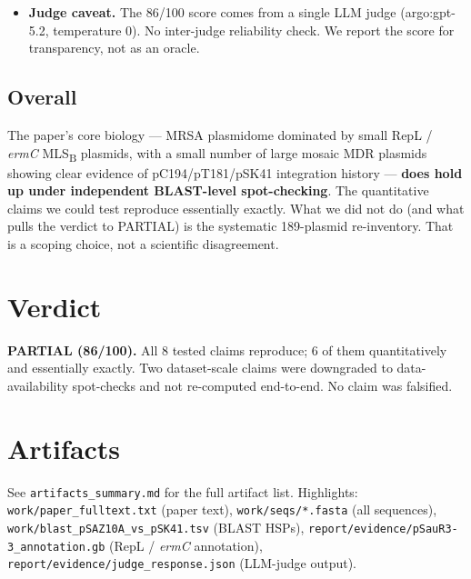 \documentclass[11pt]{article}
\begin{document}
\begin{itemize}
        contigs as ground truth. Short-read-only plasmid assemblies (SPAdes /
        Unicycler on Illumina reads without a long-read hybrid) are known to
        produce mis-joined or fragmented plasmid contigs, especially for
        multi-copy small plasmids and for large plasmids with IS-element
        repeats. Whether the deposited assemblies are structurally correct
        (vs.\ what a Nanopore/PacBio-based re-sequencing would show) is an
        \textit{open} question --- see the companion \texttt{open\_questions.json}.
  \item \textbf{Judge caveat.} The 86/100 score comes from a single LLM judge
        (argo:gpt-5.2, temperature 0). No inter-judge reliability check. We
        report the score for transparency, not as an oracle.
\end{itemize}

\subsection*{Overall}
The paper's core biology --- MRSA plasmidome dominated by small RepL /
\textit{ermC} MLS\textsubscript{B} plasmids, with a small number of large
mosaic MDR plasmids showing clear evidence of pC194/pT181/pSK41 integration
history --- \textbf{does hold up under independent BLAST-level spot-checking}.
The quantitative claims we could test reproduce essentially exactly. What we
did not do (and what pulls the verdict to PARTIAL) is the systematic
189-plasmid re-inventory. That is a scoping choice, not a scientific
disagreement.

\section{Verdict}
\textbf{PARTIAL (86/100).} All 8 tested claims reproduce; 6 of them
quantitatively and essentially exactly. Two dataset-scale claims were
downgraded to data-availability spot-checks and not re-computed end-to-end.
No claim was falsified.

\section{Artifacts}
See \texttt{artifacts\_summary.md} for the full artifact list. Highlights:
\texttt{work/paper\_fulltext.txt} (paper text), \texttt{work/seqs/*.fasta}
(all sequences), \texttt{work/blast\_pSAZ10A\_vs\_pSK41.tsv} (BLAST HSPs),
\texttt{report/evidence/pSauR3-3\_annotation.gb} (RepL / \textit{ermC}
annotation), \texttt{report/evidence/judge\_response.json} (LLM-judge output).
\end{document}

